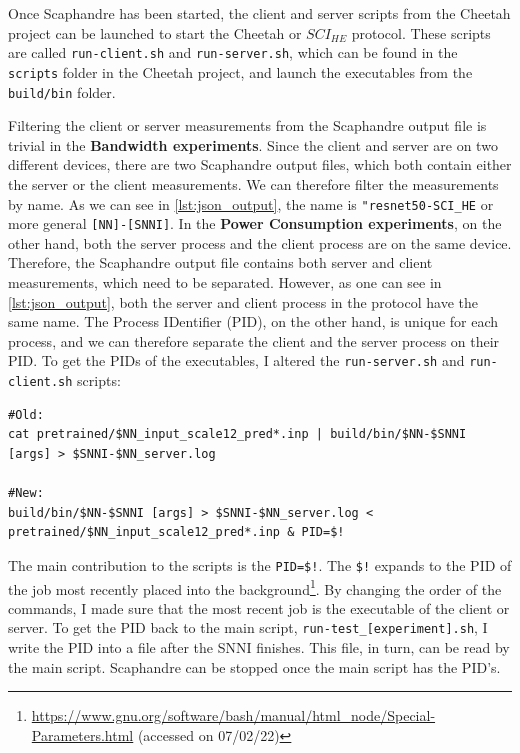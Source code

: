 \documentclass[../thesis.tex]{subfiles}
\begin{document}
Once Scaphandre has been started, the client and server scripts from the Cheetah project can be launched to start the Cheetah or $SCI_{HE}$ protocol. These scripts are called \verb|run-client.sh| and \verb|run-server.sh|, which can be found in the \verb|scripts| folder in the Cheetah project, and launch the executables from the \verb|build/bin| folder. 

Filtering the client or server measurements from the Scaphandre output file is trivial in the \textbf{Bandwidth experiments}. Since the client and server are on two different devices, there are two Scaphandre output files, which both contain either the server or the client measurements. We can therefore filter the measurements by name. As we can see in \ref{lst:json_output}, the name is \verb|"resnet50-SCI_HE| or more general \verb|[NN]-[SNNI]|. In the \textbf{Power Consumption experiments}, on the other hand, both the server process and the client process are on the same device. Therefore, the Scaphandre output file contains both server and client measurements, which need to be separated. However, as one can see in \ref{lst:json_output}, both the server and client process in the protocol have the same name. The Process IDentifier (PID), on the other hand, is unique for each process, and we can therefore separate the client and the server process on their PID. To get the PIDs of the executables, I altered the \verb|run-server.sh| and \verb|run-client.sh| scripts:

\begin{lstlisting}[language=Cplusplus, alsoletter={[]}]
#Old:
cat pretrained/$NN_input_scale12_pred*.inp | build/bin/$NN-$SNNI [args] > $SNNI-$NN_server.log
    
#New:
build/bin/$NN-$SNNI [args] > $SNNI-$NN_server.log < pretrained/$NN_input_scale12_pred*.inp & PID=$!
\end{lstlisting}

The main contribution to the scripts is the \verb|PID=$!|. The \verb|$!| expands to the PID of the job most recently placed into the background\footnote{\url{https://www.gnu.org/software/bash/manual/html_node/Special-Parameters.html} (accessed on 07/02/22)}. By changing the order of the commands, I made sure that the most recent job is the executable of the client or server. To get the PID back to the main script, \verb|run-test_[experiment].sh|, I write the PID into a file after the SNNI finishes. This file, in turn, can be read by the main script. Scaphandre can be stopped once the main script has the PID's.
\end{document}
